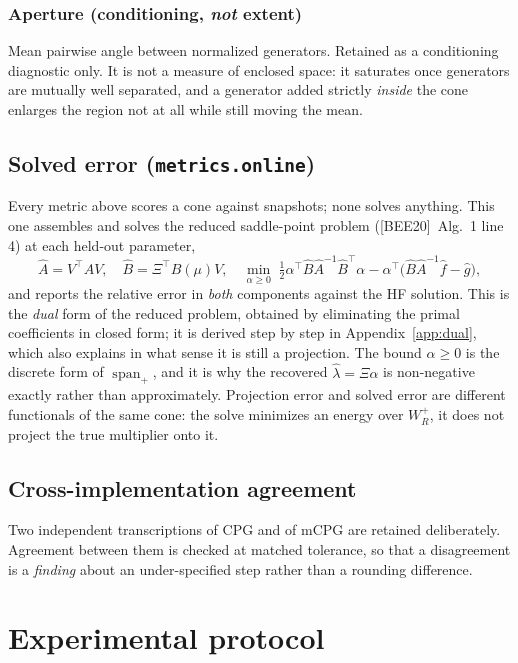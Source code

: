 \documentclass[11pt,a4paper]{article}
\newcommand{\spanp}{\operatorname{span}_+}
\newcommand{\bee}{\textsf{[BEE20]}}
\begin{document}
\subsubsection*{Aperture (conditioning, \emph{not} extent)}
Mean pairwise angle between normalized generators. Retained as a conditioning diagnostic
only. It is not a measure of enclosed space: it saturates once generators are mutually
well separated, and a generator added strictly \emph{inside} the cone enlarges the region
not at all while still moving the mean.

\subsection{Solved error (\texttt{metrics.online})}
Every metric above scores a cone against snapshots; none solves anything. This one
assembles and solves the reduced saddle-point problem (\bee{}~Alg.~1 line 4) at each
held-out parameter,
\begin{equation}
\hat A = V^{\!\top}\!AV,\quad
\hat B = \Xi^{\!\top}\!B(\mu)V,\quad
\min_{\alpha\ge0}\;\tfrac12\alpha^{\!\top}\hat B\hat A^{-1}\hat B^{\!\top}\alpha
- \alpha^{\!\top}\!\bigl(\hat B\hat A^{-1}\hat f-\hat g\bigr),
\end{equation}
and reports the relative error in \emph{both} components against the HF solution. This
is the \emph{dual} form of the reduced problem, obtained by eliminating the primal
coefficients in closed form; it is derived step by step in Appendix~\ref{app:dual}, which
also explains in what sense it is still a projection. The bound $\alpha\ge0$ is the
discrete form of $\spanp$, and it is why the recovered $\hat\lambda=\Xi\alpha$ is
non-negative exactly rather than approximately. Projection
error and solved error are different functionals of the same cone: the solve minimizes an
energy over $W_R^+$, it does not project the true multiplier onto it.

\subsection{Cross-implementation agreement}
Two independent transcriptions of CPG and of mCPG are retained deliberately. Agreement
between them is checked at matched tolerance, so that a disagreement is a \emph{finding}
about an under-specified step rather than a rounding difference.

\section{Experimental protocol}\label{sec:protocol}
\end{document}
